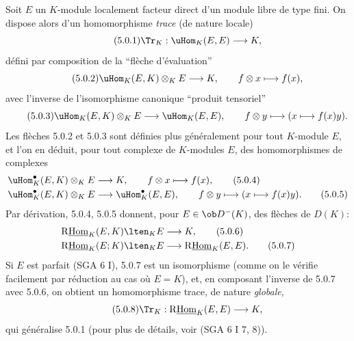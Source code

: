 Soit $E$ un $K$-module localement facteur direct d'un module libre de type fini. On dispose alors d'un homomorphisme \emph{trace} (de nature locale)
\begin{equation}\tag{5.0.1}
\Tr_K:\uHom_K(E,E)\longrightarrow K,
\end{equation}
défini par composition de la ``flèche d'évaluation''
\begin{equation}\tag{5.0.2}
\uHom_K(E,K)\otimes_KE\longrightarrow K,\qquad f\otimes x\longmapsto f(x),
\end{equation}
avec l'inverse de l'isomorphisme canonique ``produit tensoriel''
\begin{equation}\tag{5.0.3}
\uHom_K(E,K)\otimes_KE\longrightarrow\uHom_K(E,E),\qquad f\otimes y\longmapsto (x\longmapsto f(x)y).
\end{equation}
Les flèches 5.0.2 et 5.0.3 sont définies plus généralement pour tout $K$-module $E$, et l'on en déduit, pour tout complexe de $K$-modules $E$, des homomorphismes de complexes
\begin{align}
\uHom_K^\bullet(E,K)\otimes_KE&\longrightarrow K,\qquad f\otimes x\longmapsto f(x),\tag{5.0.4}\\
\uHom_K^\bullet(E,K)\otimes_KE&\longrightarrow \uHom_K^\bullet(E,E),\qquad f\otimes y\longmapsto (x\longmapsto f(x)y).\tag{5.0.5}
\end{align}
Par dérivation, 5.0.4, 5.0.5 donnent, pour $E\in\ob D^-(K)$, des flèches de $D(K)$:
\begin{align}
\mathrm{R}\underline{\mathrm{Hom}}_K(E,K)\lten_KE&\longrightarrow K,\tag{5.0.6}\\
\mathrm{R}\underline{\mathrm{Hom}}_K(E;K)\lten_KE&\longrightarrow\mathrm{R}\underline{\mathrm{Hom}}_K(E,E).\tag{5.0.7}
\end{align}
Si $E$ est
parfait (SGA 6 I), 5.0.7 est un isomorphisme (comme on le vérifie facilement par réduction au cas où $E=K$), et, en composant l'inverse de 5.0.7 avec 5.0.6, on obtient un homomorphisme trace, de nature \emph{globale},
\begin{equation}\tag{5.0.8}
\Tr_K:\mathrm{R}\underline{\mathrm{Hom}}_K(E,E)\longrightarrow K,
\end{equation}
qui généralise 5.0.1 (pour plus de détails, voir (SGA 6 I 7, 8)).

